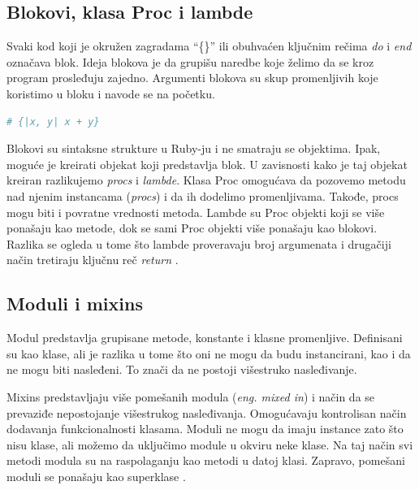 \documentclass[a4paper]{article}
\begin{document}
\subsection{Blokovi, klasa Proc i lambde}
Svaki kod koji je okružen zagradama “\{\}” ili obuhvaćen ključnim rečima \emph{do} i \emph{end} označava blok. Ideja blokova je da grupišu naredbe koje želimo da se kroz program prosleđuju zajedno. Argumenti blokova su skup promenljivih koje koristimo u bloku i navode se na početku.
\begin{lstlisting}[language=Ruby]
	# {|x, y| x + y}
\end{lstlisting}\vspace*{-15pt}

Blokovi su sintaksne strukture u Ruby-ju i ne smatraju se objektima. Ipak, moguće je kreirati objekat koji predstavlja blok. U zavisnosti kako je taj objekat kreiran razlikujemo \emph{procs} i \emph{lambde}. Klasa Proc omogućava da pozovemo metodu nad njenim instancama (\emph{procs}) i da ih dodelimo promenljivama. Takođe, procs mogu biti i povratne vrednosti metoda. Lambde su Proc objekti koji se više ponašaju kao metode, dok se sami Proc objekti više ponašaju kao blokovi. Razlika se ogleda u tome što lambde proveravaju broj argumenata i drugačiji način tretiraju ključnu reč \emph{return} \cite{rubyProgLang}.

\subsection{Moduli i mixins}
Modul predstavlja grupisane metode, konstante i klasne promenljive. Definisani su kao klase, ali je razlika u tome što oni ne mogu da budu instancirani, kao i da ne mogu biti nasleđeni. To znači da ne postoji višestruko nasleđivanje.

Mixins predstavljaju više pomešanih modula (\emph{eng. mixed in}) i način da se prevaziđe nepostojanje višestrukog nasleđivanja. Omogućavaju kontrolisan način dodavanja funkcionalnosti klasama. Moduli ne mogu da imaju instance zato što nisu klase, ali možemo da uključimo module u okviru neke klase. Na taj način svi metodi modula su na raspolaganju kao metodi u datoj klasi. Zapravo, pomešani moduli se ponašaju kao superklase \cite{ruby-doc}.
\end{document}
